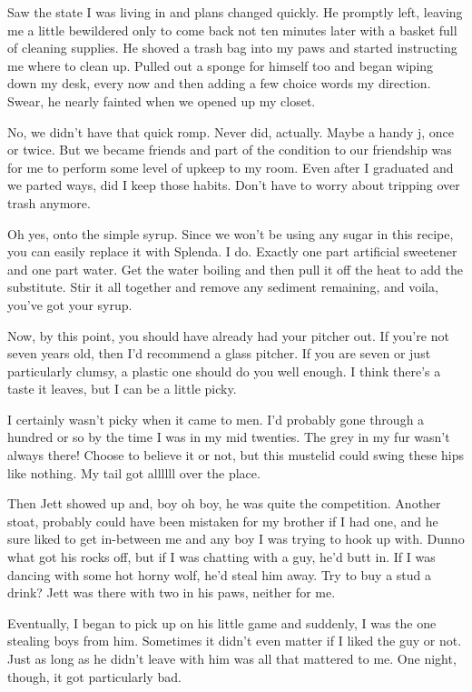 Saw the state I was living in and plans changed quickly. He promptly
left, leaving me a little bewildered only to come back not ten minutes
later with a basket full of cleaning supplies. He shoved a trash bag
into my paws and started instructing me where to clean up. Pulled out a
sponge for himself too and began wiping down my desk, every now and then
adding a few choice words my direction. Swear, he nearly fainted when we
opened up my closet.

No, we didn't have that quick romp. Never did, actually. Maybe a handy
j, once or twice. But we became friends and part of the condition to our
friendship was for me to perform some level of upkeep to my room. Even
after I graduated and we parted ways, did I keep those habits. Don't
have to worry about tripping over trash anymore.

Oh yes, onto the simple syrup. Since we won't be using any sugar in this
recipe, you can easily replace it with Splenda. I do. Exactly one part
artificial sweetener and one part water. Get the water boiling and then
pull it off the heat to add the substitute. Stir it all together and
remove any sediment remaining, and voila, you've got your syrup.

Now, by this point, you should have already had your pitcher out. If
you're not seven years old, then I'd recommend a glass pitcher. If you
are seven or just particularly clumsy, a plastic one should do you well
enough. I think there's a taste it leaves, but I can be a little picky.

I certainly wasn't picky when it came to men. I'd probably gone through
a hundred or so by the time I was in my mid twenties. The grey in my fur
wasn't always there! Choose to believe it or not, but this mustelid
could swing these hips like nothing. My tail got allllll over the place.

Then Jett showed up and, boy oh boy, he was quite the competition.
Another stoat, probably could have been mistaken for my brother if I had
one, and he sure liked to get in-between me and any boy I was trying to
hook up with. Dunno what got his rocks off, but if I was chatting with a
guy, he'd butt in. If I was dancing with some hot horny wolf, he'd steal
him away. Try to buy a stud a drink? Jett was there with two in his
paws, neither for me.

Eventually, I began to pick up on his little game and suddenly, I was
the one stealing boys from him. Sometimes it didn't even matter if I
liked the guy or not. Just as long as he didn't leave with him was all
that mattered to me. One night, though, it got particularly bad.

